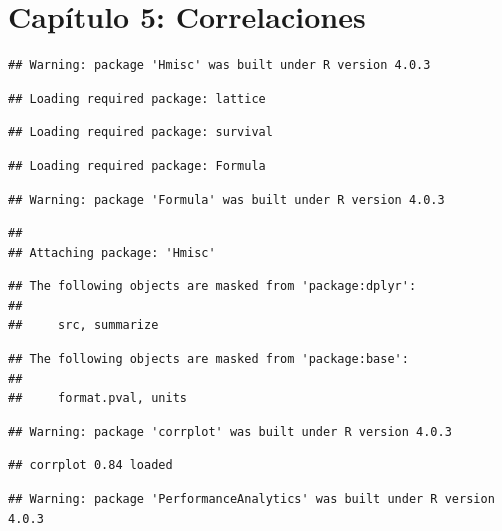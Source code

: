 \documentclass[
  11pt,
]{article}
\begin{document}
\hypertarget{capuxedtulo-5-correlaciones}{%
\section{Capítulo 5: Correlaciones}\label{capuxedtulo-5-correlaciones}}

\begin{verbatim}
## Warning: package 'Hmisc' was built under R version 4.0.3
\end{verbatim}

\begin{verbatim}
## Loading required package: lattice
\end{verbatim}

\begin{verbatim}
## Loading required package: survival
\end{verbatim}

\begin{verbatim}
## Loading required package: Formula
\end{verbatim}

\begin{verbatim}
## Warning: package 'Formula' was built under R version 4.0.3
\end{verbatim}

\begin{verbatim}
## 
## Attaching package: 'Hmisc'
\end{verbatim}

\begin{verbatim}
## The following objects are masked from 'package:dplyr':
## 
##     src, summarize
\end{verbatim}

\begin{verbatim}
## The following objects are masked from 'package:base':
## 
##     format.pval, units
\end{verbatim}

\begin{verbatim}
## Warning: package 'corrplot' was built under R version 4.0.3
\end{verbatim}

\begin{verbatim}
## corrplot 0.84 loaded
\end{verbatim}

\begin{verbatim}
## Warning: package 'PerformanceAnalytics' was built under R version 4.0.3
\end{verbatim}
\end{document}
